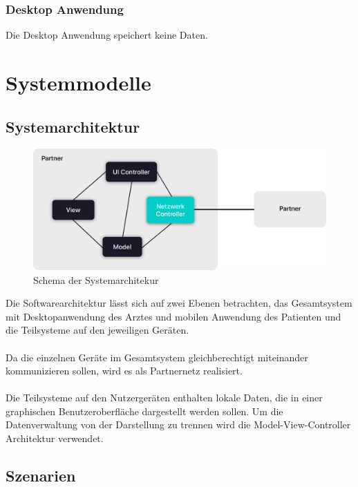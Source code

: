 \documentclass[a4paper]{scrreprt}
\begin{document}
\subsection{\gls{Desktop Anwendung}}
Die \gls{Desktop Anwendung} speichert keine Daten.


\chapter{Systemmodelle}
\section{Systemarchitektur}
\begin{figure}[ht]
  \centering
  \includegraphics[width=1\textwidth]{Systemarchitektur}
  \caption{Schema der Systemarchitekur}
\end{figure}
Die Softwarearchitektur lässt sich auf zwei Ebenen betrachten, das Gesamtsystem mit Desktopanwendung des Arztes und mobilen Anwendung des Patienten und die Teilsysteme auf den jeweiligen Geräten. \\\\
Da die einzelnen Geräte im Gesamtsystem gleichberechtigt miteinander kommunizieren sollen, wird es als Partnernetz realisiert.\\\\
Die Teilsysteme auf den Nutzergeräten enthalten lokale Daten, die in einer graphischen Benutzeroberfläche dargestellt werden sollen. Um die Datenverwaltung von der Darstellung zu trennen wird die Model-View-Controller Architektur verwendet.

\section{Szenarien}
\end{document}
